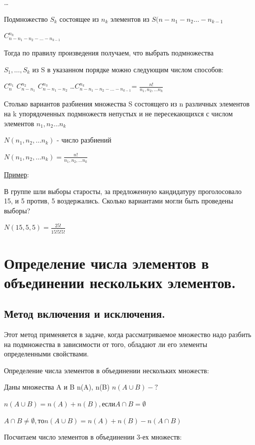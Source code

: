 \documentclass[12pt, a4paper]{article}
\begin{document}
\dots

Подмножество $S_k$ состоящее из $n_k$ элементов из $S(n-{n_1}-{n_2}\dots -{n_{k-1}}$  

$C_{n-{n_1}-{n_2}- ...-{n_{k-1}}}^{n_k} $

Тогда по правилу произведения получаем, что выбрать подмножества 

$S_1, \dots , S_k$ из S в указанном порядке можно следующим числом способов:


$C_{n}^{n_1} $
\cdot$C_{n-{n_1}}^{n_2} $
\cdot$C_{n-{n_1}-{n_2}}^{n_3} $
\dots \cdot$C_{n-{n_1}-{n_2}- ...-{n_{k-1}}}^{n_k} $= $\frac{n!}{n_1,n_2,\dots n_k}$

Столько вариантов разбиения множества S состоящего из n различных элементов на k упорядоченных подмножеств непустых и не пересекающихся с числом элементов $n_1,n_2 \dots n_k$

$N(n_1,n_2,\dots n_k)$ - число разбиений

$N(n_1,n_2,\dots n_k) = \frac{n!}{n_1,n_2,\dots n_k}$

\underline{Пример}:

В группе шли выборы старосты, за предложенную кандидатуру проголосовало 15, и 5 против, 5 воздержались. Сколько вариантами могли быть проведены выборы?

$N(15,5,5) = \frac{25!}{15!\dot5!\dot5!}$

\section{Определение числа элементов в объединении нескольких элементов.}

\subsection{Метод включения и исключения.}

Этот метод применяется в задаче, когда рассматриваемое множество надо разбить на подмножества в зависимости от того, обладают ли его элементы определенными свойствами. 

Определение числа элементов в объединении нескольких множеств:

Даны множества A и B
n(A), n(B) 
$n(A \cup B) -?$ 

$n(A\cup B) = n(A) + n(B), если A \cap B =   \emptyset$

$A\cap B \neq \emptyset, то n(A\cup B) = n(A) + n(B) - n(A\cap B)$


Посчитаем число элементов в объединении 3-ех множеств: 
\end{document}
